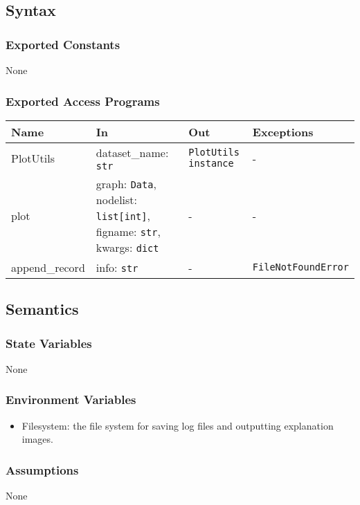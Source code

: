 \documentclass[12pt, titlepage]{article}
\begin{document}
\subsection{Syntax}

\subsubsection{Exported Constants}
None

\subsubsection{Exported Access Programs}

\begin{center}
\begin{tabular}{p{3cm} p{5cm} p{4.5cm} p{3cm}}
\hline
\textbf{Name} & \textbf{In} & \textbf{Out} & \textbf{Exceptions} \\
\hline
PlotUtils & dataset\_name: \texttt{str} & \texttt{PlotUtils instance} & - \\
plot & graph: \texttt{Data}, nodelist: \texttt{list[int]}, figname: \texttt{str}, kwargs: \texttt{dict} & - & - \\
append\_record & info: \texttt{str} & - & \texttt{FileNotFoundError} \\
\hline
\end{tabular}
\end{center}

\subsection{Semantics}

\subsubsection{State Variables}
None

\subsubsection{Environment Variables}
\begin{itemize}
  \item Filesystem: the file system for saving log files and outputting explanation images.
\end{itemize}

\subsubsection{Assumptions}
None
\end{document}
